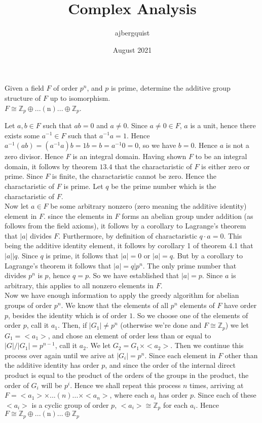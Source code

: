 \documentclass{article}
\title{Complex Analysis}
\author{ajbergquist }
\date{August 2021}
\theoremstyle{definition}
\newcommand{\Z}{\mathbb{Z}}
\begin{document}
 Given a field $F$ of order $p^n$, and $p$ is prime, determine the additive group structure of $F$ up to isomorphism.\\


 $F \cong \Z_p\oplus...(\mbox{n})...\oplus\Z_p$.

 Let $a,b\in F$ such that $ab = 0$ and $a\ne 0$. Since $a\ne 0\in F$, $a$ is a unit, hence there exists some $a^{-1}\in F$ such that $a^{-1}a = 1$. Hence $a^{-1}(ab) = (a^{-1}a)b = 1b = b = a^{-1} 0 = 0$, so we have $b = 0$. Hence $a$ is not a zero divisor. Hence $F$ is an integral domain. Having shown $F$ to be an integral domain, it follows by theorem $13.4$ that the charactaristic of $F$ is either zero or prime. Since $F$ is finite, the charactaristic cannot be zero. Hence the charactaristic of $F$ is prime. Let $q$ be the prime number which is the charactaristic of $F$.\\

Now let $a\in F$ be some arbitrary nonzero (zero meaning the additive identity) element in $F$. since the elements in $F$ forms an abelian group under addition (as follows from the field axioms), it follows by a corollary to Lagrange's theorem that $|a|$ divides $F$. Furthermore, by definition of charactaristic $q\cdot a = 0$. This being the additive identity element, it follows by corollary 1 of theorem 4.1 that $|a|\big | q$. Since $q$ is prime, it follows that $|a| = 0$ or $|a| = q$. But by a corollary to Lagrange's theorem it follows that $|a| = q \big | p^n$. The only prime number that divides $p^n$ is $p$, hence $q = p$. So we have established that $|a| = p$. Since $a$ is arbitrary, this applies to all nonzero elements in $F$.\\

Now we have enough information to apply the greedy algorithm for abelian groups of order $p^n$. We know that the elements of all $p^n$ elements of $F$ have order $p$, besides the identity which is of order $1$. So we choose one of the elements of order $p$, call it $a_1$. Then, if $|G_1|\ne p^n$ (otherwise we're done and $F \cong \Z_p$) we let $G_1 = <a_1>$, and chose an element of order less than or equal to $|G|/|G_1| = p^{n-1}$, call it $a_2$. We let $G_2 = G_1\times <a_2>$. Then we continue this process over again until we arive at $|G_i| = p^n$. Since each element in $F$ other than the additive identity has order $p$, and since the order of the internal direct product is equal to the product of the orders of the groups in the product, the order of $G_i$ will be $p^i$. Hence we shall repeat this process $n$ times, arriving at $F = <a_1>\times ...(n) ...\times <a_n>$, where each $a_i$ has order $p$. Since each of these $<a_i>$ is a cyclic group of order $p$, $<a_i>\cong \Z_p$ for each $a_i$. Hence $F \cong \Z_p\oplus...(\mbox{n})...\oplus\Z_p$
\end{document}
